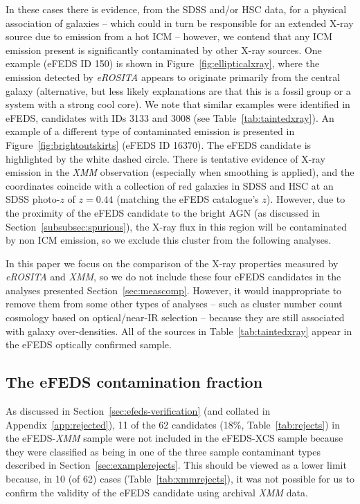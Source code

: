 \documentclass[fleqn,usenatbib]{mnras}
\begin{document}
In these cases there is evidence, from the SDSS and/or HSC data, for a physical association of galaxies -- which could in turn be responsible for an extended X-ray source due to  emission from a hot ICM  -- however, we contend that any ICM emission present is significantly contaminated by other X-ray sources. 
One example (eFEDS ID 150) is shown in Figure~\ref{fig:ellipticalxray}, where the emission detected by {\em eROSITA} appears to originate primarily from the central galaxy (alternative, but less likely explanations are that this is a fossil group or a system with a strong cool core). We note that similar examples were identified in eFEDS, candidates with IDs 3133 and 3008 (see Table~\ref{tab:taintedxray}).
An example of a different type of contaminated emission is presented in Figure~\ref{fig:brightoutskirts} (eFEDS ID 16370). The eFEDS candidate is highlighted by the white dashed circle. There is tentative evidence of X-ray emission in the {\em XMM} observation (especially when smoothing is applied), and the coordinates coincide with a collection of red galaxies in SDSS and HSC at an SDSS photo-$z$ of $z{=}0.44$ (matching the eFEDS catalogue's $z$). However, due to the proximity of the eFEDS candidate to the bright AGN (as discussed in Section~\ref{subsubsec:spurious}), the X-ray flux in this region will be contaminated by non ICM emission, so we exclude this cluster from the following analyses.

In this paper we focus on the comparison of the X-ray properties measured by {\em eROSITA} and {\em XMM}, so we do not include these four eFEDS candidates in the analyses presented Section~\ref{sec:meascomp}.
However, it would inappropriate to remove them from some other types of analyses -- such as cluster number count cosmology based on optical/near-IR selection  \cite{efedsclusteropticalcat} -- because they are still associated with galaxy over-densities. All of the sources in Table~\ref{tab:taintedxray} appear in the eFEDS optically confirmed sample.

\subsection{The eFEDS contamination fraction}
\label{sec:contamfrac}

As discussed in Section~\ref{sec:efeds-verification} (and collated in Appendix~\ref{app:rejected}), 11 of the 62 candidates (18\%, Table~\ref{tab:rejects}) in the eFEDS-{\em XMM} sample were not included in the eFEDS-XCS sample because they were classified  as being in one of the three sample contaminant types described in Section~\ref{sec:examplerejects}. This should be viewed as a lower limit because, in 10 (of 62) cases (Table~\ref{tab:xmmrejects}),  it was not possible for us to confirm the validity of the eFEDS candidate using archival {\em XMM} data. 
\end{document}
